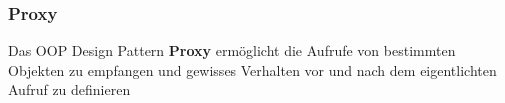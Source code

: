 \subsubsection{Proxy}

Das OOP Design Pattern \textbf{Proxy} ermöglicht die Aufrufe von bestimmten Objekten zu empfangen und gewisses Verhalten vor und nach dem eigentlichten Aufruf zu definieren